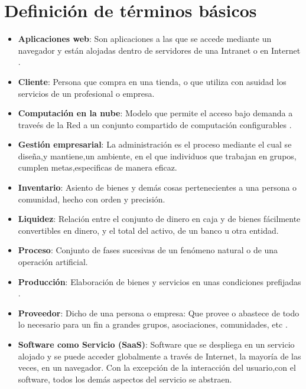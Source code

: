 \section{Definici\'on de t\'erminos b\'asicos}
\begin{itemize}
  \item \textbf{Aplicaciones web}: Son aplicaciones a las que se accede mediante un navegador y están
        alojadas dentro de servidores de una Intranet o en Internet \citep{nino}.
  \item \textbf{Cliente}: Persona que compra en una tienda, o que utiliza con asuidad los servicios
        de un profesional o empresa\citep{rae}.
  \item \textbf{Computaci\'on en la nube}: Modelo que permite el acceso bajo demanda a trave\'es
        de la Red a un conjunto compartido de computaci\'on configurables \citep{nist}.
  \item \textbf{Gesti\'on empresarial}: La administraci\'on es el proceso mediante el cual
        se dise\~na,y mantiene,un ambiente, en el que individuos que trabajan en grupos,
        cumplen metas,especificas de manera eficaz\citep{koontz}.
  \item \textbf{Inventario}: Asiento de bienes y dem\'as cosas pertenecientes a una persona o
        comunidad, hecho con orden y precisi\'on\citep{rae}.
  \item \textbf{Liquidez}: Relaci\'on entre el conjunto de dinero en caja y de bienes f\'acilmente
        convertibles en dinero, y el total del activo, de un banco u otra
        entidad\citep{rae}.
  \item \textbf{Proceso}: Conjunto de fases sucesivas de un fen\'omeno natural o de una
        operaci\'on artificial\citep{rae}.
  \item \textbf{Producci\'on}: Elaboraci\'on de bienes y servicios en unas condiciones prefijadas \citep{carro}.
  \item \textbf{Proveedor}: Dicho de una persona o empresa: Que provee o abastece de todo lo necesario
        para un fin a grandes grupos, asociaciones, comunidades, etc \citep{rae}.
  \item \textbf{Software como Servicio (SaaS)}: Software que se despliega en un servicio alojado y se
        puede acceder globalmente a trav\'es de Internet, la mayor\'ia de las veces,
        en un navegador. Con la excepci\'on de la interacci\'on del usuario,con el
        software, todos los dem\'as aspectos del servicio se abstraen\citep{sosinsky}.
\end{itemize}
